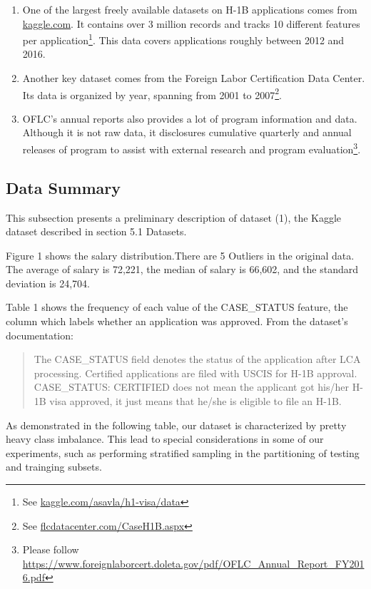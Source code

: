 \documentclass[sigconf]{acmart}
\begin{document}
\begin{enumerate}
\item One of the largest freely available datasets on H-1B applications comes from
\href{https://kaggle.com}{kaggle.com}. It contains over 3 million records and tracks 10 different features
per application\footnote{See \href{https://www.kaggle.com/asavla/h1-visa/data}{kaggle.com/asavla/h1-visa/data}}.
This data covers applications roughly between 2012 and 2016.

\item Another key dataset comes from the Foreign Labor Certification Data Center. Its data is
organized by year, spanning from 2001 to 2007\footnote{See
\href{http://www.flcdatacenter.com/CaseH1B.aspx}{flcdatacenter.com/CaseH1B.aspx}}.

\item OFLC's annual reports also provides a lot of program information and data. Although
it is not raw data, it disclosures cumulative quarterly and annual releases of program to assist
with external research and program evaluation\footnote{Please follow
\href{https://www.foreignlaborcert.doleta.gov/pdf/OFLC_Annual_Report_FY2016.pdf}{https://www.foreignlaborcert.doleta.gov/pdf/OFLC\_Annual\_Report\_FY2016.pdf}}.
\end{enumerate}


\subsection{Data Summary}
This subsection presents a preliminary description of dataset (1), the Kaggle dataset described in
section 5.1 Datasets.

Figure 1 shows the salary distribution.There are 5 Outliers in the original data. The average of
salary is 72,221, the median of salary is 66,602, and the standard deviation is 24,704.

Table 1 shows the frequency of each value of the CASE\_STATUS feature, the column which labels
whether an application was approved. From the dataset's documentation:

\begin{quote}
The CASE\_STATUS field denotes the status of the application after LCA processing. Certified
    applications are filed with USCIS for H-1B approval. CASE\_STATUS: CERTIFIED does not mean the
    applicant got his/her H-1B visa approved, it just means that he/she is eligible to file an H-1B.
\end{quote}

As demonstrated in the following table, our dataset is characterized by pretty heavy class
imbalance. This lead to special considerations in some of our experiments, such as performing
stratified sampling in the partitioning of testing and trainging subsets.
\end{document}
